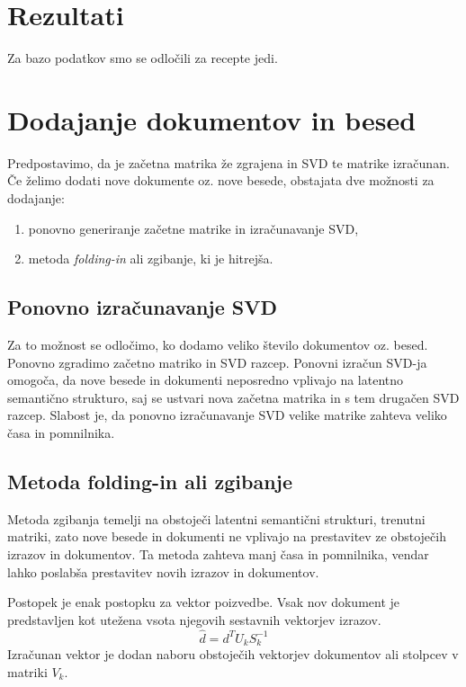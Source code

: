 \documentclass{article}
\begin{document}
\section{Rezultati}
Za bazo podatkov smo se odločili za recepte jedi.

\section{Dodajanje dokumentov in besed}
Predpostavimo, da je začetna matrika že zgrajena in SVD te matrike izračunan. Če želimo dodati nove dokumente oz. nove besede, obstajata dve možnosti za dodajanje:
\begin{enumerate}
    \item ponovno generiranje začetne matrike in izračunavanje SVD,
    \item metoda \textit{folding-in} ali zgibanje, ki je hitrejša.
\end{enumerate}
\subsection{Ponovno izračunavanje SVD}
 Za to možnost se odločimo, ko dodamo veliko število dokumentov oz. besed. Ponovno zgradimo začetno matriko in SVD razcep. Ponovni izračun SVD-ja omogoča, da nove besede in dokumenti neposredno vplivajo na latentno semantično strukturo, saj se ustvari nova začetna matrika in s tem drugačen SVD razcep. Slabost je, da ponovno izračunavanje SVD velike matrike zahteva veliko časa in pomnilnika.
\subsection{Metoda \textbf{folding-in} ali zgibanje}
\par Metoda zgibanja temelji na obstoječi latentni semantični strukturi, trenutni matriki, zato nove besede in dokumenti ne vplivajo na prestavitev ze obstoječih izrazov in dokumentov. Ta metoda zahteva manj časa in pomnilnika, vendar lahko poslabša prestavitev novih izrazov in dokumentov.
\par Postopek je enak postopku za vektor poizvedbe. Vsak nov dokument je predstavljen kot utežena vsota njegovih sestavnih vektorjev izrazov.
\[ \hat{d} = d^TU_kS^{-1}_k\]
Izračunan vektor je dodan naboru obstoječih vektorjev dokumentov ali stolpcev v matriki $V_k$. \\
\end{document}
